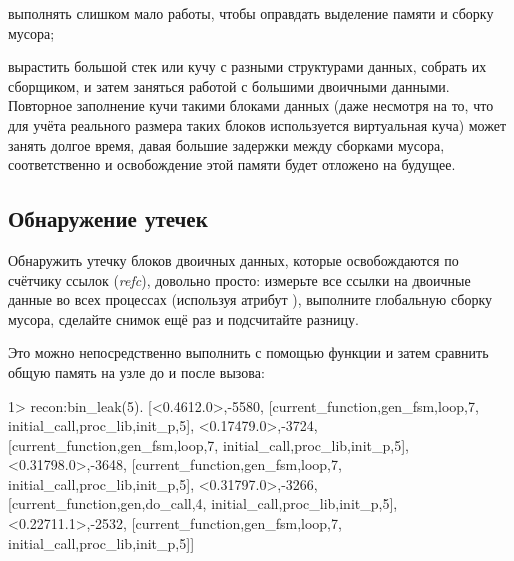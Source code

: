 \documentclass[11pt, oneside]{book}   	%
\begin{document}
\begin{enumerate*}
	\item выполнять слишком мало работы, чтобы оправдать выделение памяти и сборку мусора; 
	\item вырастить большой стек или кучу с разными структурами данных, собрать их сборщиком, и затем заняться работой с большими двоичными данными. Повторное заполнение кучи такими блоками данных (даже несмотря на то, что для учёта реального размера таких блоков используется виртуальная куча) может занять долгое время, давая большие задержки между сборками мусора, соответственно и освобождение этой памяти будет отложено на будущее.
\end{enumerate*}

\subsection{Обнаружение утечек}

Обнаружить утечку блоков двоичных данных, которые освобождаются по счётчику ссылок (\emph{refc}), довольно просто: измерьте все ссылки на двоичные данные во всех процессах (используя атрибут ), выполните глобальную сборку мусора, сделайте снимок ещё раз и подсчитайте разницу.

Это можно непосредственно выполнить с помощью функции  и затем сравнить общую память на узле до и после вызова:

\begin{VerbatimEshell}
1> recon:bin_leak(5).
[{<0.4612.0>,-5580,
  [{current_function,{gen_fsm,loop,7}},
   {initial_call,{proc_lib,init_p,5}}]},
 {<0.17479.0>,-3724,
  [{current_function,{gen_fsm,loop,7}},
   {initial_call,{proc_lib,init_p,5}}]},
 {<0.31798.0>,-3648,
  [{current_function,{gen_fsm,loop,7}},
   {initial_call,{proc_lib,init_p,5}}]},
 {<0.31797.0>,-3266,
  [{current_function,{gen,do_call,4}},
   {initial_call,{proc_lib,init_p,5}}]},
 {<0.22711.1>,-2532,
  [{current_function,{gen_fsm,loop,7}},
   {initial_call,{proc_lib,init_p,5}}]}]
\end{VerbatimEshell}
\end{document}
